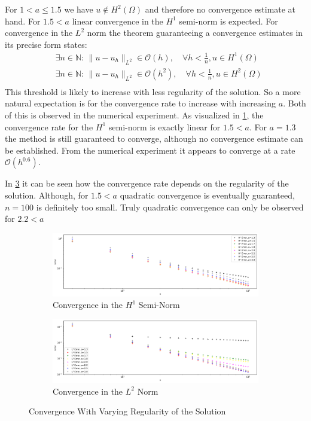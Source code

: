 \documentclass[11pt,a4paper]{article}
\begin{document}
For $1 < a \le 1.5$ we have $u \notin H^2(\Omega)$ and therefore no convergence estimate at hand.
For $1.5 < a$ linear convergence in the $H^1$ semi-norm is expected.
For convergence in the $L^2$ norm the theorem guaranteeing a convergence estimates
in its precise form states:
\begin{equation}
  \begin{split}
    &\exists n \in \mathbb{N}: \, \lVert u - u_h \rVert_{L^2} \in \mathcal{O}\left(h\right), \quad \forall h < \frac{1}{n}, u \in H^1(\Omega) \\
    &\exists n \in \mathbb{N}: \, \lVert u - u_h \rVert_{L^2} \in \mathcal{O}\left(h^2\right), \quad \forall h < \frac{1}{n}, u \in H^2(\Omega) \\
  \end{split}
\end{equation}
This threshold is likely to increase with less regularity of the solution. So a more natural
expectation is for the convergence rate to increase with increasing $a$.
Both of this is observed in the numerical experiment. As visualized in \ref{fig:err_nonsmooth_h1},
the convergence rate for the $H^1$ semi-norm is exactly linear for $1.5 < a$.
For $a = 1.3$ the method is still guaranteed to converge, although no convergence estimate can be established.
From the numerical experiment it appears to converge at a rate $\mathcal{O}\left(h^{0.6}\right)$.

In \ref{fig:err_nonsmooth_l2} it can be seen how the convergence rate depends on the regularity of the solution.
Although, for $1.5 < a$ quadratic convergence is eventually guaranteed, $n = 100$ is definitely too small.
Truly quadratic convergence can only be observed for $2.2 < a$
\begin{figure}
  \centering
  \begin{subfigure}{1\textwidth}
    \centering
    \includegraphics[width=.8\linewidth]{errors_nonsmooth_h1}
    \caption{Convergence in the $H^1$ Semi-Norm}
    \label{fig:err_nonsmooth_h1}
  \end{subfigure}

  \begin{subfigure}{1\textwidth}
    \centering
    \includegraphics[width=.8\linewidth]{errors_nonsmooth_l2}
    \caption{Convergence in the $L^2$ Norm}
    \label{fig:err_nonsmooth_l2}
  \end{subfigure}
  \caption{Convergence With Varying Regularity of the Solution}
\end{figure}
\end{document}
